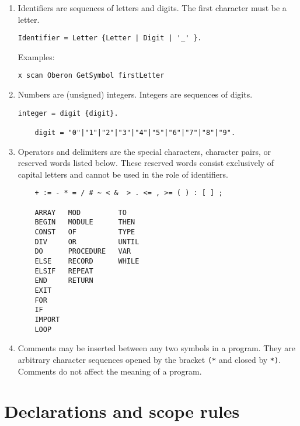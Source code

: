 \documentclass[12pt]{article}
\begin{document}
\begin{enumerate}
    \item  Identifiers are sequences of letters and digits. The first character must be a letter.
    
\begin{lstlisting}[style=ebnf]
Identifier = Letter {Letter | Digit | '_' }.
\end{lstlisting}

Examples:

\begin{lstlisting}[style=example]
    x scan Oberon GetSymbol firstLetter
\end{lstlisting}

\item Numbers are (unsigned) integers. Integers are sequences of digits.

\begin{lstlisting}[style=ebnf]
    integer = digit {digit}.

    digit = "0"|"1"|"2"|"3"|"4"|"5"|"6"|"7"|"8"|"9".
\end{lstlisting}

\item Operators and delimiters are the special characters, character pairs, or reserved words listed below. These reserved words consist exclusively of capital letters and cannot be used in the role of identifiers.

\begin{lstlisting}
    + := - * = / # ~ < &  > . <= , >= ( ) : [ ] ;       

    ARRAY   MOD         TO
    BEGIN   MODULE      THEN
    CONST   OF          TYPE       
    DIV     OR          UNTIL
    DO      PROCEDURE   VAR
    ELSE    RECORD      WHILE
    ELSIF   REPEAT
    END     RETURN
    EXIT           
    FOR     
    IF
    IMPORT
    LOOP    
\end{lstlisting}

\item Comments may be inserted between any two symbols in a program. They are arbitrary character sequences opened by the bracket \lstinline"(*" and closed by \lstinline"*)". Comments do not affect the meaning of a program.

\end{enumerate}

\section{Declarations and scope rules}
\label{declarations}
\end{document}
